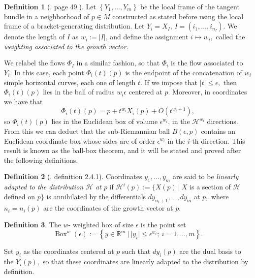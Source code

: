 \documentclass[12pt, letterpaper, reqno]{amsart}
\theoremstyle{definition}
\newtheorem{df}{Definition}
\theoremstyle{plain}
\theoremstyle{remark}
\begin{document}
\begin{df}[\cite{montgomery2002tour}, page 49.] Let $ \left\{ Y_1,\dots, Y_m \right\} $ be the local frame of the tangent bundle in a neighborhood of $ p\in M $ constructed as stated before using the local frame of a bracket-generating distribution. Let $ Y_i=X_I $, $ I=(i_1,\dots,i_{n_I}) $. We denote the length of $ I $ as $ w_i:= \left| I \right| $, and define the assignment $ i\mapsto w_i, $ called the \textit{weighting associated to the growth vector}. 
	
\end{df}

We relabel the flows $ \Phi_I $ in a similar fashion, so that $ \Phi_i $ is the flow associated to $ Y_i. $ In this case, each point $ \Phi_i(t)(p) $ is the endpoint of the concatenation of $ w_i $ simple horizontal curves, each one of length $ t $. If we impose that $ \left| t \right|\leq \epsilon, $ then $ \Phi_i(t)(p) $ lies in the ball of radius $ w_i\epsilon $ centered at $ p. $ Moreover, in coordinates we have that 
$$ \Phi_i(t)(p)=p+t^{w_i}X_i(p)+ O(t^{w_i+1}), $$ 
so $ \Phi_i(t)(p) $ lies in the Euclidean box of volume $ \epsilon^{w_i} $, in the $ \mathcal{H}^{w_i} $ directions. From this we can deduct that the sub-Riemannian ball $ B(\epsilon,p) $ contains an Euclidean coordinate box whose sides are of order $ \epsilon^{w_i} $ in the $ i $-th direction. This result is known as the ball-box theorem, and it will be stated and proved after the following definitions.

\begin{df}[\cite{montgomery2002tour}, definition 2.4.1] 
	Coordinates $ y_1,\dots,y_m $ are said to be \textit{linearly adapted to the distribution $\mathcal{H}$ at $ p $ } if $ \mathcal{H}^i(p):= \{ X(p) \ | \ X$ is a section of $\mathcal{H}$ defined on $p$$\}$ is annihilated by the differentials $ dy_{n_i+1},\dots, dy_m $ at $ p, $ where $ n_i=n_i(p) $ are the coordinates of the growth vector at $ p. $  
\end{df}
\begin{df}
	The $ w $- weighted box of size $ \epsilon $ is the point set
	$$ \operatorname{Box}^w(\epsilon) := \left\{ y\in \mathbb{R}^m \ | \ |y_i|\leq \epsilon^{w_i}; \ i=1,\dots,m \right\}.  $$ 
\end{df}

Set $ y_i $ as the coordinates centered at $ p $ such that $ dy_i(p) $ are the dual basis to the $ Y_i(p), $ so that these coordinates are linearly adapted to the distribution by definition.
\end{document}
